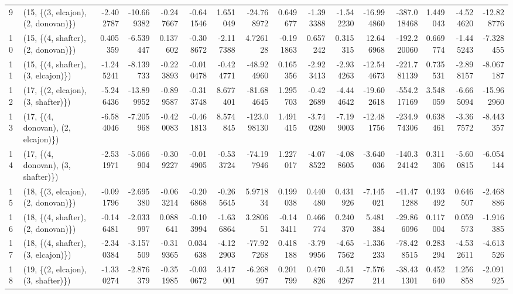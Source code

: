 \begin{tabular}{llrrrrrrrrrrrrrr}
9  &  (15, \{(3, elcajon), (2, donovan)\}) & -2.402787 & -10.669382 &  -0.247667 & -0.641546 &   1.651049 &  -24.768972 &  0.649677 &  -1.393388 & -1.542230 & -16.994860 & -387.018468 &  1.449043 & -4.524620 & -12.828776 \\
10 &  (15, \{(4, shafter), (2, donovan)\}) &  0.405359 &  -6.539447 &   0.137602 & -0.308672 &  -2.117388 &    4.726128 & -0.191863 &   0.657242 &  0.315315 &  12.646968 & -192.220060 &  0.669774 & -1.445243 &  -7.328455 \\
11 &  (15, \{(4, shafter), (3, elcajon)\}) & -1.245241 &  -8.139733 &  -0.223893 & -0.010478 &  -0.424771 &  -48.924960 &  0.165356 &  -2.923413 & -2.934263 & -12.544673 & -221.781139 &  0.735531 & -2.898157 &  -8.067187 \\
12 &  (17, \{(2, elcajon), (3, shafter)\}) & -5.246436 & -13.899952 &  -0.899587 & -0.313748 &   8.677401 &  -81.684645 &  1.295703 &  -0.422689 & -4.444642 & -19.602618 & -554.217169 &  3.548059 & -6.665094 & -15.962960 \\
13 &  (17, \{(4, donovan), (2, elcajon)\}) & -6.584046 &  -7.205968 &  -0.420083 & -0.461813 &   8.574845 & -123.098130 &  1.491415 &  -3.740280 & -7.199003 & -12.481756 & -234.974306 &  0.638461 & -3.367572 &  -8.443357 \\
14 &  (17, \{(4, donovan), (3, shafter)\}) & -2.531971 &  -5.066904 &  -0.309227 & -0.014905 &  -0.533724 &  -74.197946 &  1.227017 &  -4.078522 & -4.088605 &  -3.640036 & -140.324142 &  0.311306 & -5.600815 &  -6.054144 \\
15 &  (18, \{(3, elcajon), (2, donovan)\}) & -0.091796 &  -2.695380 &  -0.063214 & -0.206868 &  -0.265645 &    5.971834 &  0.199038 &   0.440480 &  0.431926 &  -7.145021 &  -41.471288 &  0.193492 &  0.646507 &  -2.468886 \\
16 &  (18, \{(4, shafter), (2, donovan)\}) & -0.146481 &  -2.033997 &   0.088641 & -0.103994 &  -1.636864 &    3.280651 & -0.143411 &   0.466774 &  0.240370 &   5.481384 &  -29.866096 &  0.117004 &  0.059573 &  -1.916385 \\
17 &  (18, \{(4, shafter), (3, elcajon)\}) & -2.340384 &  -3.157509 &  -0.319365 &  0.034638 &  -4.122903 &  -77.927268 &  0.418188 &  -3.799956 & -4.657562 &  -1.336233 &  -78.428515 &  0.283294 & -4.532611 &  -4.613526 \\
18 &  (19, \{(2, elcajon), (3, shafter)\}) & -1.330274 &  -2.876379 &  -0.351985 & -0.030672 &   3.417001 &   -6.268997 &  0.201799 &   0.470826 & -0.514267 &  -7.576214 &  -38.431301 &  0.452640 &  1.256858 &  -2.091925 \\

\end{tabular}
